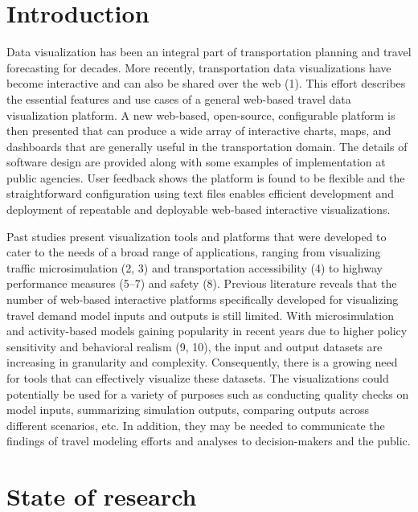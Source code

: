 \documentclass[3p,times,procedia]{elsarticle}
\begin{document}



\section{Introduction}

Data visualization has been an integral part of transportation planning and travel forecasting for decades. More recently, transportation data visualizations have become interactive and can also be shared over the web (1). This effort describes the essential features and use cases of a general web-based travel data visualization platform. A new web-based, open-source, configurable platform is then presented that can produce a wide array of interactive charts, maps, and dashboards that are generally useful in the transportation domain. The details of software design are provided along with some examples of implementation at public agencies. User feedback shows the platform is found to be flexible and the straightforward configuration using text files enables efficient development and deployment of repeatable and deployable web-based interactive visualizations.

Past studies present visualization tools and platforms that were developed to cater to the needs of a broad range of applications, ranging from visualizing traffic microsimulation (2, 3) and transportation accessibility (4) to highway performance measures (5–7) and safety (8). Previous literature reveals that the number of web-based interactive platforms specifically developed for visualizing travel demand model inputs and outputs is still limited. With microsimulation and activity-based models gaining popularity in recent years due to higher policy sensitivity and behavioral realism (9, 10), the input and output datasets are increasing in granularity and complexity. Consequently, there is a growing need for tools that can effectively visualize these datasets. The visualizations could potentially be used for a variety of purposes such as conducting quality checks on model inputs, summarizing simulation outputs, comparing outputs across different scenarios, etc. In addition, they may be needed to communicate the findings of travel modeling efforts and analyses to decision-makers and the public.


\section{State of research}
\end{document}
